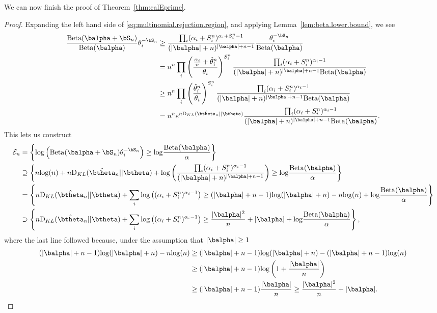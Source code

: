 \documentclass[11pt]{article}
\def\log{{\rm log}}
\newcommand{\Beta}{\mathrm{Beta}}
\newcommand{\KL}{\mathrm{D}_{KL}}
\begin{document}
We can now finish the proof of Theorem~\ref{thm:calEprime}.
\begin{proof}
Expanding the left hand side of \eqref{eq:multinomial.rejection.region}, and applying Lemma~\ref{lem:beta.lower.bound}, we see
\begin{align*}
    \frac{\Beta(\balpha + \bS_n)}
  {\Beta(\balpha)} \theta_i^{-\bS_n}
  &\geq
    \frac{ \prod_i (\alpha_i+S_i^n)^{\alpha_i + S_i^n-1}}
    {(|\balpha|+n)^{|\balpha| + n - 1}}
    \frac{ \theta_i^{-\bS_n}}{\Beta(\balpha)}\\
  &=
    n^n
    \prod_i
    \left(
    \frac{\frac{\alpha_i}{n} + \hat \theta_i^n}{\theta_i}\right)^{S_i^n}
    \frac{
    \prod_i
    (\alpha_i + S_i^n)^{\alpha_i - 1}
    }
    {(|\balpha|+n)^{|\balpha|+n-1}\Beta(\balpha)}\\
  &\geq
    n^n
    \prod_i
    \left(
    \frac{\hat \theta_i^n}{\theta_i}\right)^{S_i^n}
    \frac{
    \prod_i
    (\alpha_i + S_i^n)^{\alpha_i - 1}
    }
    {(|\balpha|+n)^{|\balpha|+n-1}\Beta(\balpha)}\\
  &=
    n^n
    e^{n \KL(\hat\btheta_n|| \btheta) }
    \frac{
    \prod_i
    (\alpha_i + S_i^n)^{\alpha_i - 1}
    }
    {(|\balpha|+n)^{|\balpha|+n-1}\Beta(\balpha)}.
\end{align*}
This lets us construct
\begin{align*}
  \mathcal E_n
  &=
  \left\{
    \log \left(
    \Beta(\balpha+\bS_n) \theta_i^{-\bS_n}
  \right)
  \geq \log\frac{\Beta(\balpha)}{\alpha}
    \right\}\\
  &\supseteq
    \left\{
        n\log(n)
    +n \KL(\hat\btheta_n|| \btheta)
    +
    \log\left(\frac{
    \prod_i
    (\alpha_i + S_i^n)^{\alpha_i - 1}
    }
    {(|\balpha|+n)^{|\balpha|+n-1}}\right)
    \geq
    \log\frac{\Beta(\balpha)}{\alpha}
    \right\}\\
  &=
    \left\{
    n \KL(\hat\btheta_n|| \btheta)
    +
    \sum_i\log\left(
    (\alpha_i + S_i^n)^{\alpha_i - 1}
    \right)
    \geq
    (|\balpha|+n-1)\log(|\balpha|+n)
    -n\log(n)
    +\log\frac{\Beta(\balpha)}{\alpha}
    \right\}\\
    &\supset
    \left\{
    n \KL(\hat\btheta_n|| \btheta)
    +
    \sum_i\log\left(
    (\alpha_i + S_i^n)^{\alpha_i - 1}
    \right)
    \geq
      \frac{|\balpha|^2}{n} + |\balpha|
    +\log\frac{\Beta(\balpha)}{\alpha}
    \right\},
\end{align*}
where the last line followed because, under the assumption that $|\balpha| \geq 1$
\begin{align*}
    (|\balpha|+n-1)\log(|\balpha|+n)
  -n\log(n)
  &\geq
    (|\balpha|+n-1)\log(|\balpha|+n)
    -(|\balpha|+n-1)\log(n)\\
  &\geq
  (|\balpha|+n-1)
    \log\left(1+\frac{|\balpha|}{n}\right)\\
  &\geq
    (|\balpha|+n-1)\frac{|\balpha|}{n}
    \geq
    \frac{|\balpha|^2}{n} + |\balpha|.
\end{align*}


\end{proof}
\end{document}
